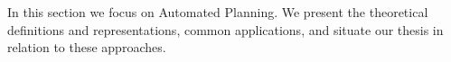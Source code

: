 In this section we focus on Automated Planning.
We present the theoretical definitions and representations, common applications, and situate our thesis in relation to these approaches.



%